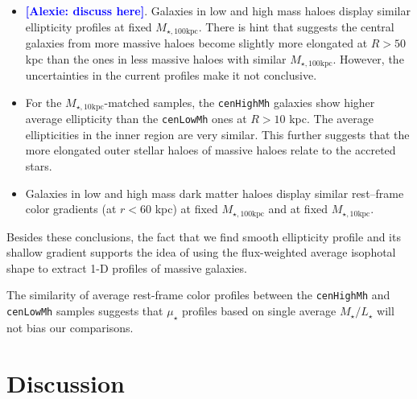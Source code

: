 \documentclass[a4paper,fleqn,usenatbib]{mnras}
\def\rbcg{\texttt{cenHighMh}}
\def\nbcg{\texttt{cenLowMh}}
\def\mhalo{{$M_{\mathrm{200b}}$}}
\def\minn{{$M_{\star,10\mathrm{kpc}}$}}
\def\mtot{{$M_{\star,100\mathrm{kpc}}$}}
\def\m2l{{$M_{\star}/L_{\star}$}}
\def\mden{{$\mu_{\star}$}}
\newcommand{\alexie}[1]{\textcolor{blue}{\textbf{[Alexie: #1]}}}
\begin{document}
    \begin{itemize}
        \item \alexie{discuss here}. Galaxies in low and high mass haloes display similar ellipticity profiles at fixed \mtot{}. There is hint that suggests the central galaxies from more massive 
            haloes become slightly more elongated at $R>50$ kpc than the ones 
            in less massive haloes with similar \mtot{}. 
            However, the uncertainties in the current profiles make it not 
            conclusive.              
        \item For the \minn{}-matched samples, the \rbcg{} galaxies show higher
            average ellipticity than the \nbcg{} ones at $R > 10$ kpc. 
            The average ellipticities in the inner region are very similar. 
            This further suggests that the more elongated outer stellar haloes 
            of massive haloes relate to the accreted stars.         
        \item Galaxies in low and high mass dark matter haloes display similar rest--frame color gradients (at $r<60$ kpc) at fixed \mtot{} and at fixed  \minn{}.    
    \end{itemize}
    
    Besides these conclusions, the fact that we find  smooth ellipticity profile and its shallow gradient supports 
            the idea of using the flux-weighted average isophotal shape to 
            extract 1-D profiles of massive galaxies. 
            
     The similarity of average rest-frame color profiles between the 
            \rbcg{} and \nbcg{} samples suggests that \mden{} profiles based on 
            single average \m2l{} will not bias our comparisons. 
    

   

\section{Discussion}
    \label{sec:discussion}
    
    
\end{document}
